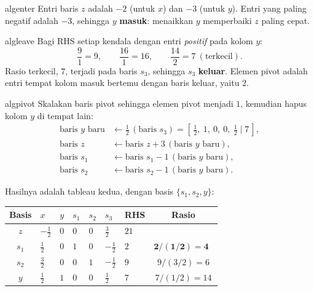 \begin{steppanel}{algenter}
 Entri baris $z$ adalah $-2$ (untuk $x$) dan $-3$
(untuk $y$). Entri yang paling negatif adalah $-3$, sehingga $y$
\textbf{masuk}: menaikkan $y$ memperbaiki $z$ paling cepat.
\end{steppanel}
\begin{steppanel}{algleave}
 Bagi RHS setiap kendala dengan entri
\emph{positif} pada kolom $y$:
\[
\frac{9}{1}=9,\qquad \frac{16}{1}=16,\qquad \frac{14}{2}=7\ (\text{terkecil}).
\]
Rasio terkecil, $7$, terjadi pada baris $s_3$, sehingga $s_3$ \textbf{keluar}.
Elemen pivot adalah entri tempat kolom masuk bertemu dengan baris keluar, yaitu
$2$.
\end{steppanel}
\begin{steppanel}{algpivot}
 Skalakan baris pivot sehingga elemen pivot menjadi $1$, kemudian hapus kolom $y$ di tempat lain:
\[
\begin{aligned}
\text{baris }y\text{ baru} &\leftarrow \tfrac12\,(\text{baris }s_3) = [\,\tfrac12,\ 1,\ 0,\ 0,\ \tfrac12 \mid 7\,],\\
\text{baris }z &\leftarrow \text{baris }z + 3\,(\text{baris }y\text{ baru}),\\
\text{baris }s_1 &\leftarrow \text{baris }s_1 - 1\,(\text{baris }y\text{ baru}),\\
\text{baris }s_2 &\leftarrow \text{baris }s_2 - 1\,(\text{baris }y\text{ baru}).
\end{aligned}
\]
\end{steppanel}

\noindent Hasilnya adalah tableau kedua, dengan basis $\{s_1,s_2,y\}$:
\begin{center}
\renewcommand{\arraystretch}{1.3}
\begin{tabular}{c|ZZZZZ|Z|c}
\toprule
Basis & $x$ & $y$ & $s_1$ & $s_2$ & $s_3$ & RHS & Rasio\\
\midrule
$z$   & $-\tfrac12$ & $0$ & $0$ & $0$ & $\tfrac32$ & $21$ & \\
\midrule
{}$s_1$ & $\tfrac12$ & $0$ & $1$ & $0$ & $-\tfrac12$ & $2$ & $\mathbf{2/(1/2)=4}$\ \\
$s_2$ & $\tfrac32$ & $0$ & $0$ & $1$ & $-\tfrac12$ & $9$ & $9/(3/2)=6$\\
$y$   & $\tfrac12$ & $1$ & $0$ & $0$ & $\tfrac12$ & $7$ & $7/(1/2)=14$\\
\bottomrule
\end{tabular}
\end{center}

